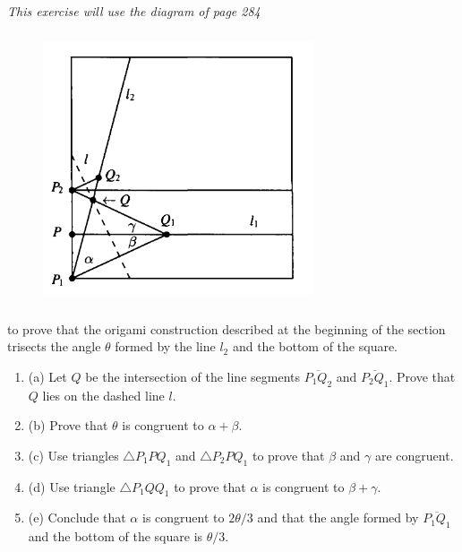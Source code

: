 \documentclass[11pt,a4paper]{article}
\newcommand{\be} {\begin{enumerate}}
\newcommand{\ee} {\end{enumerate}}
\begin{document}
{\it This exercise will use the diagram of page 284 
\begin{figure}[htbp]
\begin{center}
\includegraphics [width=8cm,height=8cm] {Ex.10.3.1.png}
\end{center}
\end{figure}
to prove that the origami construction described at the beginning of the section trisects the angle $\theta$ formed by the line $l_2$ and the bottom of the square.
\be
\item[(a)] Let $Q$ be the intersection of the line segments $\overline{P_1Q_2}$ and $\overline{P_2Q_1}$. Prove that $Q$ lies on the dashed line $l$.
\item[(b)] Prove that $\theta$ is congruent to $\alpha+\beta$.
\item[(c)] Use triangles $\bigtriangleup P_1PQ_1$ and $\bigtriangleup P_2PQ_1$ to prove that $\beta$ and $\gamma$ are congruent.
\item[(d)] Use triangle $\bigtriangleup P_1QQ_1$ to prove that $\alpha$ is congruent to $\beta + \gamma$.
\item[(e)] Conclude that $\alpha$ is congruent to $2\theta/3$ and that the angle formed by $\overline{P_1Q_1}$ and the bottom of the square is $\theta/3$. 
\ee
}
\end{document}
